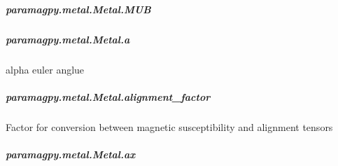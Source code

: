 \documentclass[a4paper,10pt,english]{sphinxmanual}
\begin{document}
\begin{fulllineitems}
\begin{fulllineitems}
\subparagraph{paramagpy.metal.Metal.MUB}
\label{\detokenize{reference/generated/paramagpy.metal.Metal.MUB:paramagpy-metal-metal-mub}}\label{\detokenize{reference/generated/paramagpy.metal.Metal.MUB::doc}}

\begin{fulllineitems}
\label{\detokenize{reference/generated/paramagpy.metal.Metal.MUB:paramagpy.metal.Metal.MUB}}
\end{fulllineitems}



\subparagraph{paramagpy.metal.Metal.a}
\label{\detokenize{reference/generated/paramagpy.metal.Metal.a:paramagpy-metal-metal-a}}\label{\detokenize{reference/generated/paramagpy.metal.Metal.a::doc}}

\begin{fulllineitems}
\label{\detokenize{reference/generated/paramagpy.metal.Metal.a:paramagpy.metal.Metal.a}}
alpha euler anglue

\end{fulllineitems}



\subparagraph{paramagpy.metal.Metal.alignment\_factor}
\label{\detokenize{reference/generated/paramagpy.metal.Metal.alignment_factor:paramagpy-metal-metal-alignment-factor}}\label{\detokenize{reference/generated/paramagpy.metal.Metal.alignment_factor::doc}}

\begin{fulllineitems}
\label{\detokenize{reference/generated/paramagpy.metal.Metal.alignment_factor:paramagpy.metal.Metal.alignment_factor}}
Factor for conversion between magnetic susceptibility
and alignment tensors

\end{fulllineitems}



\subparagraph{paramagpy.metal.Metal.ax}
\label{\detokenize{reference/generated/paramagpy.metal.Metal.ax:paramagpy-metal-metal-ax}}\label{\detokenize{reference/generated/paramagpy.metal.Metal.ax::doc}}


\end{fulllineitems}
\end{fulllineitems}
\end{document}
